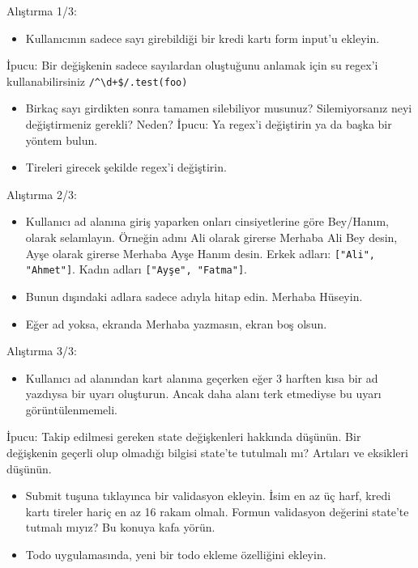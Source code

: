 \documentclass[presentation]{beamer}
\begin{document}
\begin{frame}[fragile,label=sec-15]{Alıştırma 1/3:}
 \begin{itemize}
\item Kullanıcının sadece sayı girebildiği bir kredi kartı form input'u ekleyin.
\end{itemize}

İpucu: Bir değişkenin sadece sayılardan oluştuğunu anlamak için su regex'i kullanabilirsiniz \texttt{/\textasciicircum{}\textbackslash{}d+\$/.test(foo)}

\begin{itemize}
\item Birkaç sayı girdikten sonra tamamen silebiliyor musunuz? Silemiyorsanız neyi
değiştirmeniz gerekli? Neden? İpucu: Ya regex'i değiştirin ya da başka bir
yöntem bulun.

\item Tireleri girecek şekilde regex'i değiştirin.
\end{itemize}
\end{frame}

\begin{frame}[fragile,label=sec-16]{Alıştırma 2/3:}
 \begin{itemize}
\item Kullanıcı ad alanına giriş yaparken onları cinsiyetlerine göre Bey/Hanım,
olarak selamlayın. Örneğin adını Ali olarak girerse Merhaba Ali Bey desin,
Ayşe olarak girerse Merhaba Ayşe Hanım desin. Erkek adları: \texttt{["Ali",
  "Ahmet"]}. Kadın adları \texttt{["Ayşe", "Fatma"]}.
\item Bunun dışındaki adlara sadece adıyla hitap edin. Merhaba Hüseyin.
\item Eğer ad yoksa, ekranda Merhaba yazmasın, ekran boş olsun.
\end{itemize}
\end{frame}

\begin{frame}[label=sec-17]{Alıştırma 3/3:}
\begin{itemize}
\item Kullanıcı ad alanından kart alanına geçerken eğer 3 harften kısa bir ad
yazdıysa bir uyarı oluşturun. Ancak daha alanı terk etmediyse bu uyarı
görüntülenmemeli.
\end{itemize}

İpucu: Takip edilmesi gereken state değişkenleri hakkında düşünün. Bir
değişkenin geçerli olup olmadığı bilgisi state'te tutulmalı mı? Artıları ve
eksikleri düşünün.

\begin{itemize}
\item Submit tuşuna tıklayınca bir validasyon ekleyin. İsim en az üç harf, kredi
kartı tireler hariç en az 16 rakam olmalı. Formun validasyon değerini
state'te tutmalı mıyız? Bu konuya kafa yörün.

\item Todo uygulamasında, yeni bir todo ekleme özelliğini ekleyin.
\end{itemize}
\end{frame}
\end{document}
